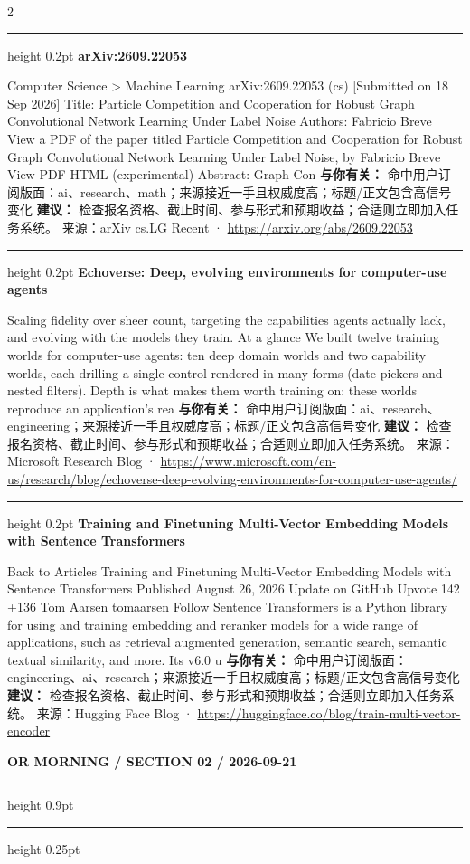 \documentclass[10.5pt]{ctexart}
\begin{document}
\begin{multicols}{2}
\vspace{2mm}
\hrule height 0.2pt
\vspace{2mm}
{\large\bfseries arXiv:2609.22053}\par
Computer Science > Machine Learning arXiv:2609.22053 (cs) [Submitted on 18 Sep 2026] Title: Particle Competition and Cooperation for Robust Graph Convolutional Network Learning Under Label Noise Authors: Fabricio Breve View a PDF of the paper titled Particle Competition and Cooperation for Robust Graph Convolutional Network Learning Under Label Noise, by Fabricio Breve View PDF HTML (experimental) Abstract: Graph Con
\textbf{与你有关：} 命中用户订阅版面：ai、research、math；来源接近一手且权威度高；标题/正文包含高信号变化
\textbf{建议：} 检查报名资格、截止时间、参与形式和预期收益；合适则立即加入任务系统。
{\footnotesize\color{ormuted} 来源：arXiv cs.LG Recent · \url{https://arxiv.org/abs/2609.22053}}
\vspace{2mm}
\hrule height 0.2pt
\vspace{2mm}
{\large\bfseries Echoverse: Deep, evolving environments for computer-use agents}\par
Scaling fidelity over sheer count, targeting the capabilities agents actually lack, and evolving with the models they train. At a glance We built twelve training worlds for computer-use agents: ten deep domain worlds and two capability worlds, each drilling a single control rendered in many forms (date pickers and nested filters). Depth is what makes them worth training on: these worlds reproduce an application’s rea
\textbf{与你有关：} 命中用户订阅版面：ai、research、engineering；来源接近一手且权威度高；标题/正文包含高信号变化
\textbf{建议：} 检查报名资格、截止时间、参与形式和预期收益；合适则立即加入任务系统。
{\footnotesize\color{ormuted} 来源：Microsoft Research Blog · \url{https://www.microsoft.com/en-us/research/blog/echoverse-deep-evolving-environments-for-computer-use-agents/}}
\vspace{2mm}
\hrule height 0.2pt
\vspace{2mm}
{\large\bfseries Training and Finetuning Multi-Vector Embedding Models with Sentence Transformers}\par
Back to Articles Training and Finetuning Multi-Vector Embedding Models with Sentence Transformers Published August 26, 2026 Update on GitHub Upvote 142 +136 Tom Aarsen tomaarsen Follow Sentence Transformers is a Python library for using and training embedding and reranker models for a wide range of applications, such as retrieval augmented generation, semantic search, semantic textual similarity, and more. Its v6.0 u
\textbf{与你有关：} 命中用户订阅版面：engineering、ai、research；来源接近一手且权威度高；标题/正文包含高信号变化
\textbf{建议：} 检查报名资格、截止时间、参与形式和预期收益；合适则立即加入任务系统。
{\footnotesize\color{ormuted} 来源：Hugging Face Blog · \url{https://huggingface.co/blog/train-multi-vector-encoder}}
\end{multicols}
\newpage
{\small\bfseries OR MORNING / SECTION 02 / 2026-09-21}
\vspace{2mm}
\hrule height 0.9pt
\vspace{1.5mm}
\hrule height 0.25pt
\vspace{4mm}
\end{document}
